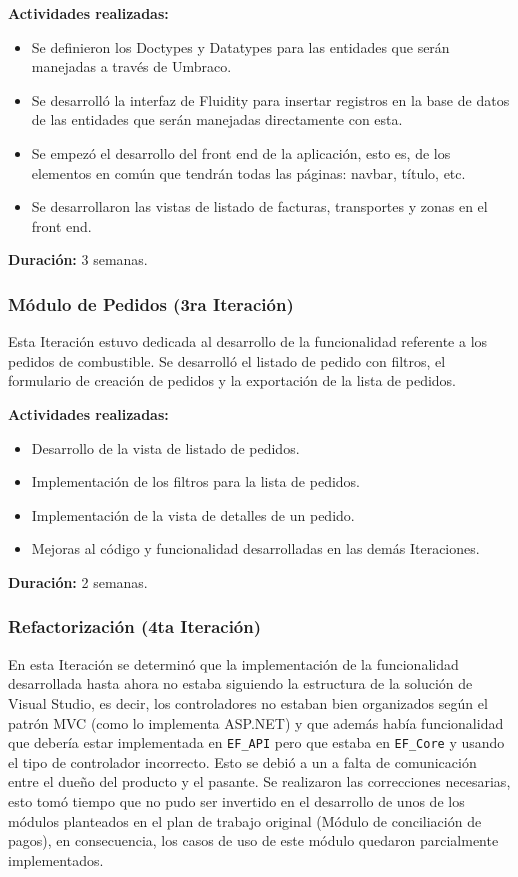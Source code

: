 \textbf{Actividades realizadas:}
\begin{itemize}
    \item Se definieron los Doctypes y Datatypes para las entidades que serán manejadas a través de Umbraco.
    \item Se desarrolló la interfaz de Fluidity para insertar registros en la base de datos de las entidades que serán manejadas directamente con esta.
    \item Se empezó el desarrollo del front end de la aplicación, esto es, de los elementos en común que tendrán todas las páginas: navbar, título, etc.
    \item Se desarrollaron las vistas de listado de facturas, transportes y zonas en el front end.
\end{itemize}

\textbf{Duración:} 3 semanas.

\subsubsection{Módulo de Pedidos (3ra Iteración)}
Esta Iteración estuvo dedicada al desarrollo de la funcionalidad referente a los pedidos de combustible. Se desarrolló el listado de pedido con filtros, el formulario de creación de pedidos y la exportación de la lista de pedidos.

\textbf{Actividades realizadas:}
\begin{itemize}
    \item Desarrollo de la vista de listado de pedidos.
    \item Implementación de los filtros para la lista de pedidos.
    \item Implementación de la vista de detalles de un pedido.
    \item Mejoras al código y funcionalidad desarrolladas en las demás Iteraciones.
\end{itemize}

\textbf{Duración:} 2 semanas.

\subsubsection{Refactorización (4ta Iteración)}
En esta Iteración se determinó que la implementación de la funcionalidad desarrollada hasta ahora no estaba siguiendo la estructura de la solución de Visual Studio, es decir, los controladores no estaban bien organizados según el patrón MVC (como lo implementa ASP.NET) y que además había funcionalidad que debería estar implementada en \verb|EF_API| pero que estaba en \verb|EF_Core| y usando el tipo de controlador incorrecto. Esto se debió a un a falta de comunicación entre el dueño del producto y el pasante. Se realizaron las correcciones necesarias, esto tomó tiempo que no pudo ser invertido en el desarrollo de unos de los módulos planteados en el plan de trabajo original (Módulo de conciliación de pagos), en consecuencia, los casos de uso de este módulo quedaron parcialmente implementados.

